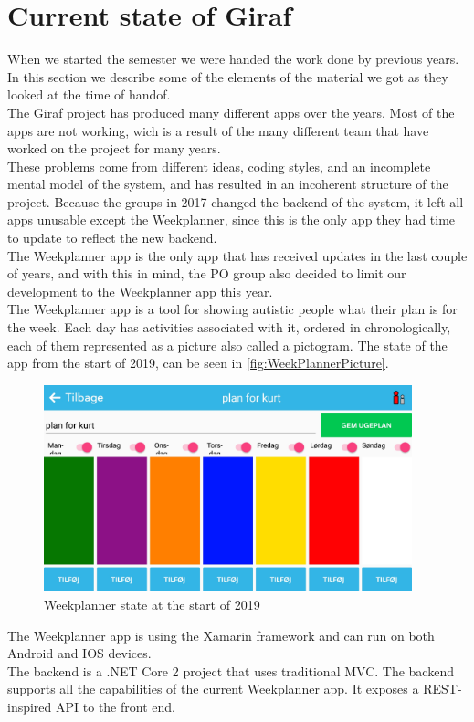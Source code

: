 \section{Current state of Giraf}

When we started the semester we were handed the work done by previous years. In this section we describe some of the elements of the material we got as they looked at the time of handof.\\
The Giraf project has produced many different apps over the years. Most of the apps are not working, wich is a result of the many different team that have worked on the project for many years.\\
These problems come from different ideas, coding styles, and an incomplete mental model of the system, and has resulted in an incoherent structure of the project. Because the groups in 2017 \cite{SW608F18} changed the backend of the system, it left all apps unusable except the Weekplanner, since this is the only app they had time to update to reflect the new backend.\\
The Weekplanner app is the only app that has received updates in the last couple of years, and with this in mind, the \gls{PO} group also decided to limit our development to the Weekplanner app this year.\\
The Weekplanner app is a tool for showing autistic people what their plan is for the week. Each day has activities associated with it, ordered in chronologically, each of them represented as a picture also called a pictogram. The state of the app from the start of 2019, can be seen in \autoref{fig:WeekPlannerPicture}.\\

\begin{figure}[H]
        \begin{center}
            \includegraphics[width=0.95\textwidth]{figures/WeekPlannerPicture}
        \end{center}
        \caption{Weekplanner state at the start of 2019}
        \label{fig:WeekPlannerPicture}
\end{figure}

The Weekplanner app is using the Xamarin framework and can run on both Android and IOS devices.\\
The backend is a .NET Core 2 project that uses traditional MVC. The backend supports all the capabilities of the current Weekplanner app. It exposes a REST-inspired API to the front end.\\